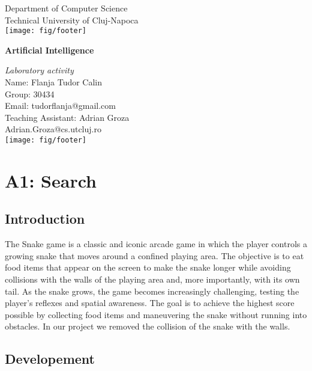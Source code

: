 \documentclass[a4paper,12pt]{report}
\begin{document}
\vspace{-5cm}
\begin{center}
Department of Computer Science\\
Technical University of Cluj-Napoca\\
\texttt{[image: fig/footer]}
\end{center}
\vspace{1cm}
\begin{center}
\begin{Large}
 \textbf{Artificial Intelligence}\\
\end{Large}
\textit{Laboratory activity}\\
\vspace{3cm}
Name: Flanja Tudor Calin\\
Group: 30434\\
Email: tudorflanja@gmail.com\\
\vspace{12cm}
Teaching Assistant: Adrian Groza\\
Adrian.Groza@cs.utcluj.ro\\
\vspace{1cm}
\texttt{[image: fig/footer]}
\end{center}

\tableofcontents


\chapter{A1: Search}
\section{Introduction}
The Snake game is a classic and iconic arcade game in which the player controls a growing snake that moves around a confined playing area. The objective is to eat food items that appear on the screen to make the snake longer while avoiding collisions with the walls of the playing area and, more importantly, with its own tail. As the snake grows, the game becomes increasingly challenging, testing the player's reflexes and spatial awareness. The goal is to achieve the highest score possible by collecting food items and maneuvering the snake without running into obstacles. In our project we removed the collision of the snake with the walls.
\section{Developement}
\end{document}
